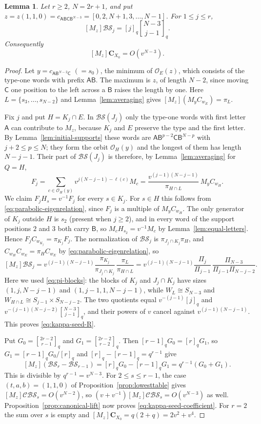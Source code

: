 \documentclass[11pt,a4paper,reqno]{amsart}
\numberwithin{equation}{section}
\newtheorem{lemma}[theorem]{Lemma}
\theoremstyle{definition}
\theoremstyle{remark}
\theoremstyle{plain}
\newcommand{\C}{\mathbf C}
\newcommand{\A}{\mathsf A}
\newcommand{\B}{\mathsf B}
\newcommand{\CC}{\mathsf C}
\newcommand{\gb}[2]{\genfrac{[}{]}{0pt}{}{#1}{#2}_q}
\newcommand{\D}{\mathcal {BS}}
\newcommand{\R}{\mathcal {BS}}
\newcommand{\V}{\mathcal {CBS}}
\begin{document}
\begin{lemma}\label{lem:kappa-seed-coefficient}
Let $r\geq2$, $N=2r+1$, and put $z=z(1,1,0)=c_{\A\B\CC\B^{N-3}}=[0,2,N+1,3,\ldots,N-1]$. For $1\leq j\leq r$,
\begin{equation}\label{eq:kappa-seed-R}
 [M_z]\R_j=[j]_q\gb{N-3}{j-1}.
\end{equation}
Consequently
\begin{equation}\label{eq:kappa-seed-coefficient}
 [M_z]\C_{X_0}=O(v^{N-3}).
\end{equation}
\end{lemma}
\begin{proof}
Let $y=c_{\A\B^{N-2}\CC}$ $(=s_0)$, the minimum of $\mathcal O_E(z)$, which consists of the type-one words with prefix $\A\B$.
The maximum is $z$, of length $N-2$, since moving $\CC$ one position to the left across a $\B$ raises the length by one.
Here $L=\{s_3,\ldots,s_{N-2}\}$ and Lemma~\ref{lem:averaging} gives $[M_z](M_yC_{w_E})=\pi_L$.

Fix $j$ and put $H=K_j\cap E$. In $\D(J_j)$ only the type-one words with first letter $\A$ can contribute to $M_z$,
because $K_j$ and $E$ preserve the type and the first letter. By Lemma~\ref{lem:initial-supports} these words are
$\A\B^{p-2}\CC\B^{N-p}$ with $j+2\leq p\leq N$; they form the orbit $\mathcal O_H(y)$ and the longest of them has length $N-j-1$.
Their part of $\D(J_j)$ is therefore, by Lemma~\ref{lem:averaging} for $Q=H$,
\[
 F_j=\sum_{c\in\mathcal O_H(y)}v^{j(N-j-1)-\ell(c)}M_c=\frac{v^{(j-1)(N-j-1)}}{\pi_{H\cap L}}\,M_yC_{w_H}.
\]
We claim $F_jH_s=v^{-1}F_j$ for every $s\in K_j$. For $s\in H$ this follows from \eqref{eq:parabolic-eigenrelation}, since $F_j$ is a multiple of
$M_yC_{w_H}$. The only generator of $K_j$ outside $H$ is $s_2$ (present when $j\geq2$), and in every word of the support
positions $2$ and $3$ both carry $\B$, so $M_cH_{s_2}=v^{-1}M_c$ by Lemma~\ref{lem:equal-letters}. Hence $F_jC_{w_{K_j}}=\pi_{K_j}F_j$.
The normalization of $\R_j$ is $\pi_{J_j\cap K_j}\pi_H$, and $C_{w_H}C_{w_E}=\pi_HC_{w_E}$ by \eqref{eq:parabolic-eigenrelation}, so
\[
 [M_z]\R_j
 =v^{(j-1)(N-j-1)}\frac{\pi_{K_j}}{\pi_{J_j\cap K_j}}\,\frac{\pi_L}{\pi_{H\cap L}}
 =v^{(j-1)(N-j-1)}\frac{\Pi_j}{\Pi_{j-1}}\,\frac{\Pi_{N-3}}{\Pi_{j-1}\Pi_{N-j-2}} .
\]
Here we used \eqref{eq:pi-blocks}: the blocks of $K_j$ and $J_j\cap K_j$ have sizes $(1,j,N-j-1)$ and $(1,j-1,1,N-j-1)$, while $W_L\cong S_{N-3}$ and
$W_{H\cap L}\cong S_{j-1}\times S_{N-j-2}$. The two quotients equal $v^{-(j-1)}[j]_q$ and $v^{-(j-1)(N-j-2)}\gb{N-3}{j-1}$, and their powers of $v$
cancel against $v^{(j-1)(N-j-1)}$.
This proves \eqref{eq:kappa-seed-R}.

Put $G_0=\gb{2r-2}{r-1}$ and $G_1=\gb{2r-2}{r-2}$. Then $[r-1]_qG_0=[r]_qG_1$, so
$G_1=[r-1]_qG_0/[r]_q$ and $[r]_q-[r-1]_q=q^{r-1}$ give
\[
 [M_z](\R_r-\R_{r-1})=[r]_qG_0-[r-1]_qG_1=q^{r-1}(G_0+G_1).
\]
This is divisible by $q^{r-1}=v^{N-3}$. For $2\leq s\leq r-1$, the case $(t,a,b)=(1,1,0)$ of Proposition~\ref{prop:lowesttable} gives
$[M_z]\V_s=O(v^{N-2})$, so $(v+v^{-1})[M_z]\V_s=O(v^{N-3})$ as well. Proposition~\ref{prop:canonical-lift} now proves
\eqref{eq:kappa-seed-coefficient}. For $r=2$ the sum over $s$ is empty and $[M_z]\C_{X_0}=q(2+q)=2v^2+v^4$.
\end{proof}
\end{document}

